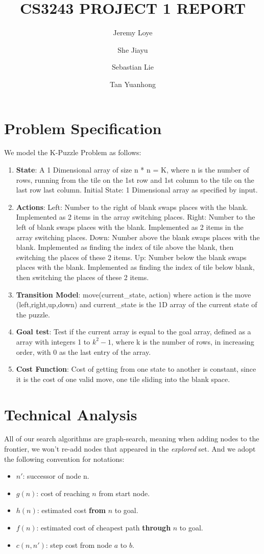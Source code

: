 \documentclass{llncs}
\begin{document}
\title{CS3243 PROJECT 1 REPORT}
\author{Jeremy Loye \and She Jiayu \and Sebastian Lie \and Tan Yuanhong}
\maketitle
\section{Problem Specification}
We model the K-Puzzle Problem as follows:
\begin{enumerate}
	\item \textbf{State}: A 1 Dimensional array of size n * n = K, where n is the number of rows, running from the tile on the 1st row and 1st column to the tile on the last row last column. Initial State: 1 Dimensional array as specified by input.
	\item \textbf{Actions}: Left: Number to the right of blank swaps places with the blank. Implemented as 2 items in the array switching places. Right:  Number to the left of blank swaps places with the blank. Implemented as 2 items in the array switching places. Down: Number above the blank swaps places with the blank. Implemented as finding the index of tile above the blank, then switching the places of these 2 items. Up: Number below the blank swaps places with the blank. Implemented as finding the index of tile below blank, then switching the places of these 2 items.
	\item \textbf{Transition Model}: move(current\_state, action) where action is the move (left,right,up,down) and current\_state is the 1D array of the current state of the puzzle.
	\item \textbf{Goal test}: Test if the current array is equal to the goal array, defined as a array with integers 1 to $k^2 - 1$, where k is the number of rows, in increasing order, with 0 as the last entry of the array.
	\item \textbf{Cost Function}: Cost of getting from one state to another is constant, since it is the cost of one valid move, one tile sliding into the blank space.
\end{enumerate}

\section{Technical Analysis}
All of our search algorithms are graph-search, meaning when adding nodes to the frontier, we won’t re-add nodes that appeared in the \emph{explored} set. And we adopt the following convention for notations:
\begin{itemize}
    \item $n'$: successor of node n. 
	\item $g(n)$: cost of reaching $n$ from start node.
	\item $h(n)$: estimated cost \textbf{from} $n$ to goal.
	\item $f(n)$: estimated cost of cheapest path \textbf{through} $n$ to goal.
	\item $c(n,n')$: step cost from node $a$ to $b$.
\end{itemize}
\end{document}
